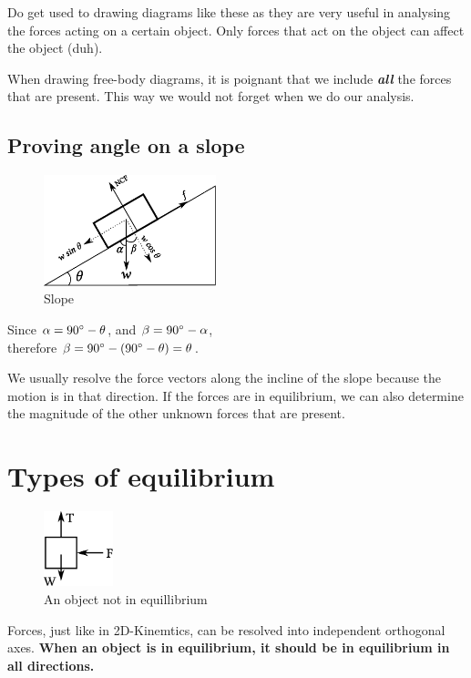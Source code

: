 \documentclass[11pt]{article}
\numberwithin{equation}{section}
\begin{document}
	Do get used to drawing diagrams like these as they are very useful in analysing the forces acting on a certain object. Only forces that act on the object can affect the object (duh). 
	
	When drawing free-body diagrams, it is poignant that we include \textit{\textbf{all}} the forces that are present. This way we would not forget when we do our analysis.
		\subsection{Proving angle on a slope}
		\begin{figure}
			\vspace{-0.7cm}
			\includegraphics[width=5cm]{slope.eps}
			\caption{Slope}
			\label{fig:slope}
			\vspace{-1cm}
		\end{figure}
		Since $\alpha = 90\degree - \theta$, and $\beta = 90\degree - \alpha$, \\therefore $\beta = 90\degree - (90\degree - \theta) = \theta$.
		
		We usually resolve the force vectors along the incline of the slope because the motion is in that direction. If the forces are in equilibrium, we can also determine the magnitude of the other unknown forces that are present. 
	\section{Types of equilibrium}
		\begin{figure}
			\centering
			\vspace{-0.7cm}
			\includegraphics[width=2cm]{not_eqm.eps}
			\caption{An object not in equillibrium}
			\label{fig:not_eqm}
			\vspace{-0.5cm}
		\end{figure}
		Forces, just like in 2D-Kinemtics, can be resolved into independent orthogonal axes. \textbf{When an object is in equilibrium, it should be in equilibrium in all directions.}
		
\end{document}
